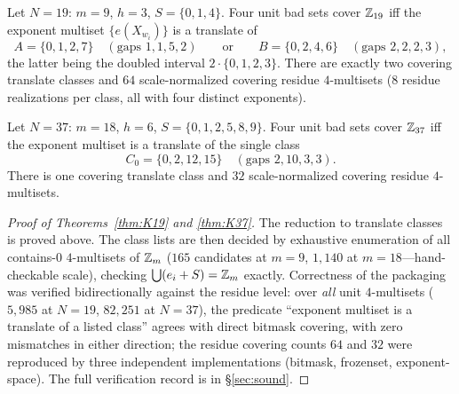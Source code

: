 \begin{theorem}[$K_{19}$]\label{thm:K19}
Let $N=19$: $m=9$, $h=3$, $S=\{0,1,4\}$. Four unit bad sets cover
$\mathbb{Z}_{19}$ iff the exponent multiset $\{e(X_{w_i})\}$ is a translate of
\[
A=\{0,1,2,7\}\quad(\text{gaps }1,1,5,2)
\qquad\text{or}\qquad
B=\{0,2,4,6\}\quad(\text{gaps }2,2,2,3),
\]
the latter being the doubled interval $2\cdot\{0,1,2,3\}$. There are
exactly two covering translate classes and $64$ scale-normalized covering
residue $4$-multisets ($8$ residue realizations per class, all with four
distinct exponents).
\end{theorem}

\begin{theorem}[$K_{37}$]\label{thm:K37}
Let $N=37$: $m=18$, $h=6$, $S=\{0,1,2,5,8,9\}$. Four unit bad sets cover
$\mathbb{Z}_{37}$ iff the exponent multiset is a translate of the single class
\[
C_0=\{0,2,12,15\}\quad(\text{gaps }2,10,3,3).
\]
There is one covering translate class and $32$ scale-normalized covering
residue $4$-multisets.
\end{theorem}

\begin{proof}[Proof of Theorems~\ref{thm:K19} and \ref{thm:K37}]
The reduction to translate classes is proved above. The class lists are
then decided by exhaustive enumeration of all contains-$0$ $4$-multisets
of $\mathbb{Z}_m$ ($165$ candidates at $m=9$, $1{,}140$ at $m=18$---hand-checkable
scale), checking $\bigcup(e_i+S)=\mathbb{Z}_m$ exactly. Correctness of the
packaging was verified bidirectionally against the residue level: over
\emph{all} unit $4$-multisets ($5{,}985$ at $N=19$, $82{,}251$ at
$N=37$), the predicate ``exponent multiset is a translate of a listed
class'' agrees with direct bitmask covering, with zero mismatches in
either direction; the residue covering counts $64$ and $32$ were
reproduced by three independent implementations (bitmask, frozenset,
exponent-space). The full verification record is in \S\ref{sec:sound}.
\end{proof}

